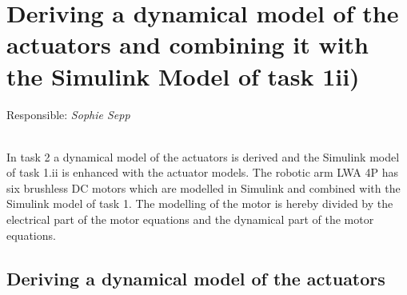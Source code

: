 \chapter{Deriving a dynamical model of the actuators and combining it with the Simulink Model  of task 1ii)}\label{chapter:2}
\vspace{-0.25cm}
Responsible: \textit{Sophie Sepp}


\ \\

In task 2 a dynamical model of the actuators is derived and the Simulink model of task 1.ii is enhanced with the actuator models. The robotic arm LWA 4P has six brushless DC motors which are modelled in Simulink and combined with the Simulink model of task 1. The modelling of the motor is hereby divided by the electrical part of the motor equations and the dynamical part of the motor equations.

\section{Deriving a dynamical model of the actuators }


